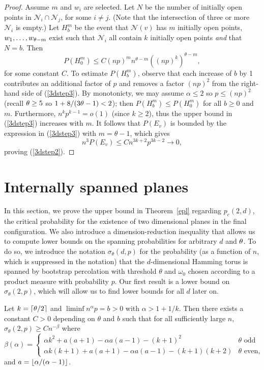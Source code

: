 \begin{proof}
Assume $m$ and $w_i$ are selected. Let $N$ be the number of 
initially open points in $\mathcal{N}_i\cap \mathcal{N}_j$, for some
$i\ne j$. (Note that the intersection of three or more $\mathcal{N}_i$ is empty.)
Let $H_b^m$ be the event that $\mathcal{N}(v)$ has $m$ initially open points, $w_1, \ldots, w_{\theta-m}$ exist such that $\mathcal{N}_i$ 
all contain $k$ initially open points {\it and\/} that 
$N=b$. Then 
\begin{equation}
\label{3dstep3}
P(H_0^m)\le C(np)^m n^{\theta-m} \left((np)^k\right)^{\theta-m},
\end{equation}
for some constant $C$. To estimate $P(H_b^m)$, observe that
each increase of $b$ by 1 contributes an additional factor of $p$ and removes a factor
$(np)^2$ from the right-hand side of (\ref{3dstep3}). By monotonicty, we may assume 
$\alpha\le 2$ so $p\le (np)^2$ (recall $\theta\geq 5$ so $1+ 8/(3\theta-1)<2$); then $P(H_b^m)\le P(H_0^m)$ for all $b\ge 0$ and $m$. 
Furthermore, $n^k p^{k-1} = o(1)$ (since $k\geq 2$), thus the upper bound in (\ref{3dstep3}) increases 
with $m$.  It follows that $P(E_v)$ is bounded by the expression in (\ref{3dstep3}) with $m=\theta-1$, 
which gives
$$
n^3P(E_v)\le C n^{3k+2}p^{3k-2}\to 0,
$$
proving (\ref{3dstep2}).
\end{proof}
 

\section{Internally spanned planes}
\label{suffforplanes}
In this section, we prove the upper bound in Theorem~\ref{epl} regarding $p_c(2,d)$, the critical probability for the existence of two dimensional planes in the final configuration.  We also introduce a dimension-reduction inequality that allows us to compute lower bounds on the spanning probabilities for arbitrary $d$ and $\theta$.  To do so, we introduce the notation $\sigma_\theta(d,p)$ for the probability (as a function of $n$, which is suppressed in the notation) that the $d$-dimensional Hamming torus is spanned by bootstrap percolation with threshold $\theta$ and $\omega_0$ chosen according to a product measure with probability $p$.  Our first result is a lower bound on $\sigma_\theta(2,p)$, which will allow us to find lower bounds for all $d$ later on.

\begin{lemma}
\label{2d-span-lb-lem}
Let $k = \left\lceil\theta/2\right \rceil$ and $\liminf n^{\alpha}p = b >0$ with $\alpha > 1+1/k$.  Then there exists a constant $C>0$ depending on $\theta$ and $b$ such that for all sufficiently large $n$, $\sigma_{\theta}(2,p)\geq Cn^{-\beta}$ where
\begin{equation}
\beta(\alpha) = \begin{cases}
 \alpha k^2 +a(a+1) - \alpha a(a-1) - (k+1)^2 & \theta \text{ odd} \\
 \alpha k(k+1) + a(a+1) - \alpha a(a-1) - (k+1)(k+2) & \theta \text{ even},
\end{cases}
\end{equation}
and $a = \left\lfloor\alpha/(\alpha-1)\right \rfloor$.
\end{lemma}

